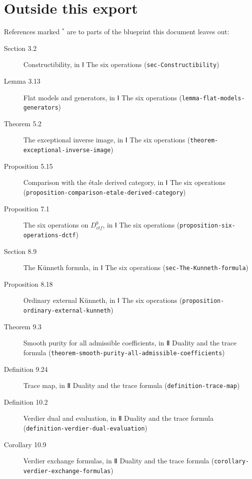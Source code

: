 \documentclass[11pt]{article}
\newcommand{\bpslug}[1]{\texttt{#1}}
\providecommand{\Dctf}{}\renewcommand{\Dctf}{D^b_{ctf}}
\begin{document}
\section*{Outside this export}
References marked \ensuremath{{}^\ast} are to parts of the blueprint this document leaves out:
\begin{description}
\item[Section 3.2] Constructibility, in Ⅰ The six operations (\bpslug{sec-{}\allowbreak{}Constructibility})
\item[Lemma 3.13] Flat models and generators, in Ⅰ The six operations (\bpslug{lemma-{}\allowbreak{}flat-{}\allowbreak{}models-{}\allowbreak{}generators})
\item[Theorem 5.2] The exceptional inverse image, in Ⅰ The six operations (\bpslug{theorem-{}\allowbreak{}exceptional-{}\allowbreak{}inverse-{}\allowbreak{}image})
\item[Proposition 5.15] Comparison with the étale derived category, in Ⅰ The six operations (\bpslug{proposition-{}\allowbreak{}comparison-{}\allowbreak{}etale-{}\allowbreak{}derived-{}\allowbreak{}category})
\item[Proposition 7.1] The six operations on $\Dctf$, in Ⅰ The six operations (\bpslug{proposition-{}\allowbreak{}six-{}\allowbreak{}operations-{}\allowbreak{}dctf})
\item[Section 8.9] The Künneth formula, in Ⅰ The six operations (\bpslug{sec-{}\allowbreak{}The-{}\allowbreak{}Kunneth-{}\allowbreak{}formula})
\item[Proposition 8.18] Ordinary external Künneth, in Ⅰ The six operations (\bpslug{proposition-{}\allowbreak{}ordinary-{}\allowbreak{}external-{}\allowbreak{}kunneth})
\item[Theorem 9.3] Smooth purity for all admissible coefficients, in Ⅱ Duality and the trace formula (\bpslug{theorem-{}\allowbreak{}smooth-{}\allowbreak{}purity-{}\allowbreak{}all-{}\allowbreak{}admissible-{}\allowbreak{}coefficients})
\item[Definition 9.24] Trace map, in Ⅱ Duality and the trace formula (\bpslug{definition-{}\allowbreak{}trace-{}\allowbreak{}map})
\item[Definition 10.2] Verdier dual and evaluation, in Ⅱ Duality and the trace formula (\bpslug{definition-{}\allowbreak{}verdier-{}\allowbreak{}dual-{}\allowbreak{}evaluation})
\item[Corollary 10.9] Verdier exchange formulas, in Ⅱ Duality and the trace formula (\bpslug{corollary-{}\allowbreak{}verdier-{}\allowbreak{}exchange-{}\allowbreak{}formulas})

\end{description}
\end{document}
